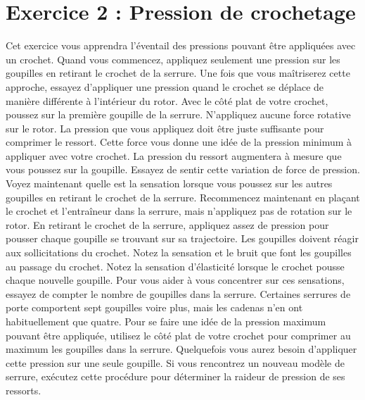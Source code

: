 \documentclass[a4paper,french,11pt,twoside]{report}
\begin{document}
\section{Exercice 2 : Pression de crochetage}
Cet exercice vous apprendra l'éventail des pressions pouvant être appliquées avec un crochet. Quand vous commencez, appliquez seulement une pression sur les goupilles en retirant le crochet de la serrure. Une fois que vous maîtriserez cette approche, essayez d'appliquer une pression quand le crochet se déplace de manière différente à l'intérieur du rotor.
Avec le côté plat de votre crochet, poussez sur la première goupille de la serrure. N'appliquez aucune force rotative sur le rotor. La pression que vous appliquez doit être juste suffisante pour comprimer le ressort. Cette force vous donne une idée de la pression minimum à appliquer avec votre crochet. La pression du ressort augmentera à mesure que vous poussez sur la goupille. Essayez de sentir cette variation de force de pression.
Voyez maintenant quelle est la sensation lorsque vous poussez sur les autres goupilles en retirant le crochet de la serrure. Recommencez maintenant en plaçant le crochet et l'entraîneur dans la serrure, mais n'appliquez pas de rotation sur le rotor. En retirant le crochet de la serrure, appliquez assez de pression pour pousser chaque goupille se trouvant sur sa trajectoire. Les goupilles doivent réagir aux sollicitations du crochet. Notez la sensation et le bruit que font les goupilles au passage du crochet. Notez la sensation d'élasticité lorsque le crochet pousse chaque nouvelle goupille.
Pour vous aider à vous concentrer sur ces sensations, essayez de compter le nombre de goupilles dans la serrure. Certaines serrures de porte comportent sept goupilles voire plus, mais les cadenas n'en ont habituellement que quatre. Pour se faire une idée de la pression maximum pouvant être appliquée, utilisez le côté plat de votre crochet pour comprimer au maximum les goupilles dans la serrure. Quelquefois vous aurez besoin d'appliquer cette pression sur une seule goupille. Si vous rencontrez un nouveau modèle de serrure, exécutez cette procédure pour déterminer la raideur de pression de ses ressorts.
\end{document}
